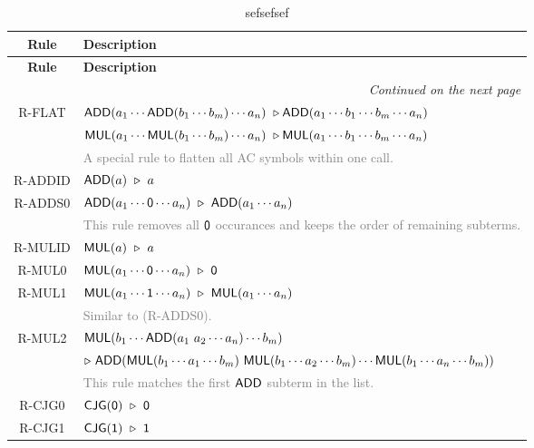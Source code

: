 \documentclass{article}
\begin{document}
\renewcommand{\arraystretch}{1.2} %
\begin{longtable}{cl}
    \caption{sefsefsef}\\
    \hline
    \textbf{Rule} & \textbf{Description} \\
    \hline
    \endfirsthead

    \hline
    \textbf{Rule} & \textbf{Description} \\
    \hline
    \endhead

    \hline
    \multicolumn{2}{r}{\textit{Continued on the next page}} \\
    \hline
    \endfoot

    \hline
    \endlastfoot

    R-FLAT
    & $\mathsf{ADD}(a_1 \cdots \mathsf{ADD}(b_1 \cdots b_m) \cdots a_n)\ \triangleright \mathsf{ADD}(a_1 \cdots b_1 \cdots b_m \cdots a_n)$ \\
    & $\mathsf{MUL}(a_1 \cdots \mathsf{MUL}(b_1 \cdots b_m) \cdots a_n)\ \triangleright \mathsf{MUL}(a_1 \cdots b_1 \cdots b_m \cdots a_n)$ \\
    & \textcolor{gray}{A special rule to flatten all AC symbols within one call.} \\
    R-ADDID 
    & $\ADD(a) \ \reduce\ a$ \\
    R-ADDS0 
    & $\mathsf{ADD}(a_1 \cdots \mathsf{0} \cdots a_n) \ \triangleright\ \mathsf{ADD}(a_1 \cdots a_n)$ \\
    & \textcolor{gray}{This rule removes all $\mathsf{0}$ occurances and keeps the order of remaining subterms.} \\
    R-MULID 
    & $\MUL(a) \ \reduce\ a$ \\
    R-MUL0
    & $\mathsf{MUL}(a_1 \cdots \mathsf{0} \cdots a_n) \ \triangleright\ \mathsf{0}$ \\
    R-MUL1
    & $\mathsf{MUL}(a_1 \cdots \mathsf{1} \cdots a_n) \ \triangleright\ \mathsf{MUL}(a_1 \cdots a_n)$ \\
    & \textcolor{gray}{Similar to (R-ADDS0).} \\
    R-MUL2
    & $\mathsf{MUL}(b_1 \cdots \mathsf{ADD}(a_1\ a_2 \cdots a_n) \cdots b_m)$ \\
    & $\reduce\ \ADD(\MUL(b_1 \cdots a_1\cdots b_m)\ \MUL(b_1 \cdots a_2\cdots b_m) \cdots \MUL(b_1\cdots a_n \cdots b_m))$ \\
    & \textcolor{gray}{This rule matches the first $\mathsf{ADD}$ subterm in the list.} \\
    R-CJG0
    & $\CJG(\ZERO) \ \reduce\ \ZERO$ \\
    R-CJG1
    & $\CJG(\ONE) \ \reduce\ \ONE$ \\

\end{longtable}
\end{document}

